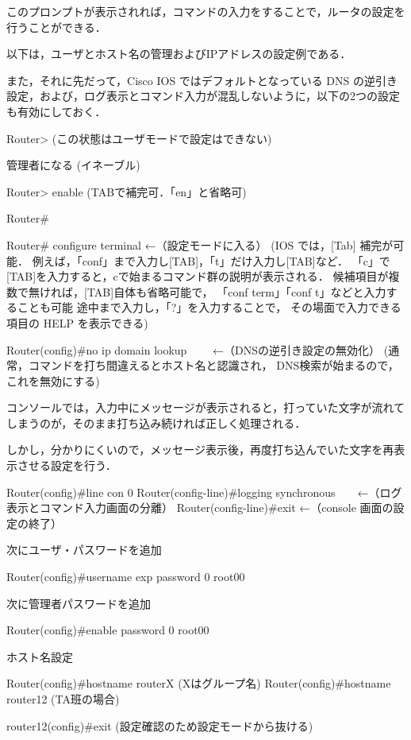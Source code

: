 このプロンプトが表示されれば，コマンドの入力をすることで，ルータの設定を行うことができる．

以下は，ユーザとホスト名の管理およびIPアドレスの設定例である．

また，それに先だって，Cisco IOS ではデフォルトとなっている DNS の逆引き
設定，および，ログ表示とコマンド入力が混乱しないように，以下の2つの設定
も有効にしておく．
\clearpage

\begin{cli}

Router>
(この状態はユーザモードで設定はできない)

管理者になる (イネーブル)

Router> enable
(TABで補完可．「en」と省略可)

Router#

Router# configure terminal                                 ←（設定モードに入る）
  (IOS では，[Tab] 補完が可能．
   例えば，「conf」まで入力し[TAB]，「t」だけ入力し[TAB]など．
    「c」で[TAB]を入力すると，cで始まるコマンド群の説明が表示される．
   候補項目が複数で無ければ，[TAB]自体も省略可能で，
   「conf term」「conf t」などと入力することも可能
   途中まで入力し，「?」を入力することで，
   その場面で入力できる項目の HELP を表示できる)

Router(config)#no ip domain lookup　　               ←（DNSの逆引き設定の無効化）
  (通常，コマンドを打ち間違えるとホスト名と認識され，
  DNS検索が始まるので，これを無効にする)
  
コンソールでは，入力中にメッセージが表示されると，打っていた文字が流れてしまうのが，そのまま打ち込み続ければ正しく処理される．

しかし，分かりにくいので，メッセージ表示後，再度打ち込んでいた文字を再表示させる設定を行う．
  
Router(config)#line con 0   
Router(config-line)#logging synchronous　　←（ログ表示とコマンド入力画面の分離）
Router(config-line)#exit       ←（console 画面の設定の終了）

次にユーザ・パスワードを追加

Router(config)#username exp password 0 root00

次に管理者パスワードを追加

Router(config)#enable password 0 root00

ホスト名設定

Router(config)#hostname routerX  (Xはグループ名)
Router(config)#hostname router12  (TA班の場合)


router12(config)#exit  (設定確認のため設定モードから抜ける)


\end{cli}

